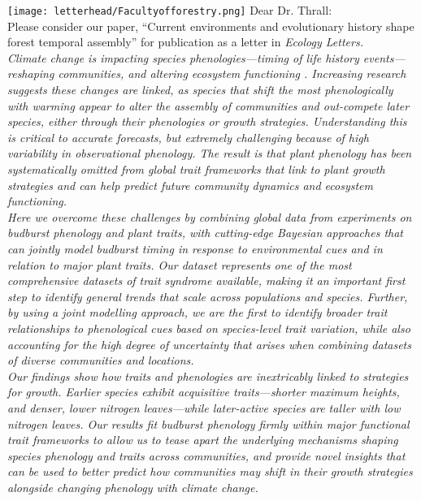 \documentclass[11pt,a4paper]{article}
\begin{document}

\noindent \texttt{[image: letterhead/Facultyofforestry.png]}
\noindent Dear Dr. Thrall:
\vspace{1.5ex}\\
\noindent Please consider our paper, ``Current environments and evolutionary history shape forest temporal assembly'' for publication as a letter in \emph{Ecology Letters. 
\vspace{1.5ex}\\ 

\noindent Climate change is impacting species phenologies---timing of life history events---reshaping communities, and altering ecosystem functioning \citep{Cleland2007a,Beard2019,Gu2022}. Increasing research suggests these changes are linked, as species that shift the most phenologically with warming appear to alter the assembly of communities and out-compete later species, either through their phenologies or growth strategies. Understanding this is critical to accurate forecasts, but extremely challenging because of high variability in observational phenology. The result is that plant phenology has been systematically omitted from global trait frameworks that link to plant growth strategies and can help predict future community dynamics and ecosystem functioning.
\vspace{1.5ex}\\
\noindent Here we overcome these challenges by combining global data from experiments on budburst phenology and plant traits, with cutting-edge Bayesian approaches that can jointly model budburst timing in response to environmental cues and in relation to major plant traits. Our dataset represents one of the most comprehensive datasets of trait syndrome available, making it an important first step to identify general trends that scale across populations and species. Further, by using a joint modelling approach, we are the first to identify broader trait relationships to phenological cues based on species-level trait variation, while also accounting for the high degree of uncertainty that arises when combining datasets of diverse communities and locations.
\vspace{1.5ex}\\
\noindent  Our findings show how traits and phenologies are inextricably linked to strategies for growth. Earlier species exhibit acquisitive traits---shorter maximum heights, and denser, lower nitrogen leaves---while later-active species are taller with low nitrogen leaves. Our results fit budburst phenology firmly within major functional trait frameworks to allow us to tease apart the underlying mechanisms shaping species phenology and traits across communities, and provide novel insights that can be used to better predict how communities may shift in their growth strategies alongside changing phenology with climate change. 
}
\end{document}
